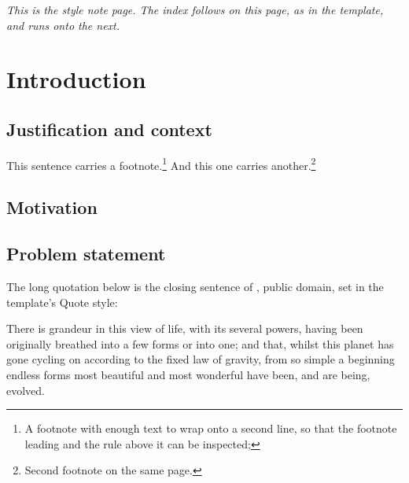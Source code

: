 \expandafter\documentclass\expandafter[\tfglang]{utad-tfg}
\begin{document}
\tfgcover

\begin{tfgacknowledgements}
\lipsum[1]
\end{tfgacknowledgements}

\textit{This is the style note page. The index follows on this page, as in
the template, and runs onto the next.}

\tfgindex

\begin{tfgabstractpage}
\end{tfgabstractpage}

\chapter{Introduction}
\label{ch:intro}

\lipsum[4-5]

\section{Justification and context}
\label{sec:context}
\lipsum[6-7] This sentence carries a footnote.\footnote{A footnote with
enough text to wrap onto a second line, so that the footnote leading and
the rule above it can be inspected; \lipsum[66]} And this one carries
another.\footnote{Second footnote on the same page.}

\lipsum[8]

\section{Motivation}
\kant[1-2]

\section{Problem statement}
The long quotation below is the closing sentence of \textcite{darwin1859},
public domain, set in the template's Quote style:
\begin{tfgquote}
There is grandeur in this view of life, with its several powers, having been
originally breathed into a few forms or into one; and that, whilst this
planet has gone cycling on according to the fixed law of gravity, from so
simple a beginning endless forms most beautiful and most wonderful have
been, and are being, evolved.
\end{tfgquote}
\lipsum[9-10]
\end{document}
